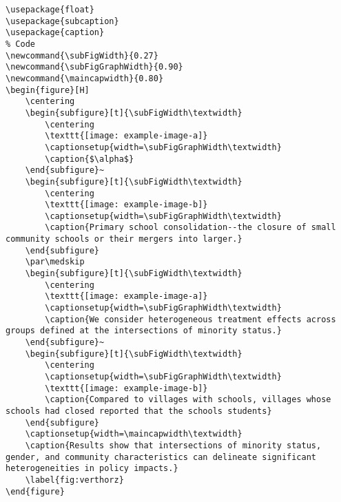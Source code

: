 \documentclass[12pt,english]{article}
\begin{document}
\begin{lstlisting}[frame=single]
% Included Package
\usepackage{float}
\usepackage{subcaption}
\usepackage{caption}
% Code
\newcommand{\subFigWidth}{0.27}
\newcommand{\subFigGraphWidth}{0.90}
\newcommand{\maincapwidth}{0.80}
\begin{figure}[H]
    \centering
    \begin{subfigure}[t]{\subFigWidth\textwidth}
        \centering
        \texttt{[image: example-image-a]}
        \captionsetup{width=\subFigGraphWidth\textwidth}
        \caption{$\alpha$}
    \end{subfigure}~
	\begin{subfigure}[t]{\subFigWidth\textwidth}
	    \centering
    	\texttt{[image: example-image-b]}
    	\captionsetup{width=\subFigGraphWidth\textwidth}
    	\caption{Primary school consolidation--the closure of small community schools or their mergers into larger.}
	\end{subfigure}
	\par\medskip
	\begin{subfigure}[t]{\subFigWidth\textwidth}
        \centering
        \texttt{[image: example-image-a]}
        \captionsetup{width=\subFigGraphWidth\textwidth}
        \caption{We consider heterogeneous treatment effects across groups defined at the intersections of minority status.}
    \end{subfigure}~
	\begin{subfigure}[t]{\subFigWidth\textwidth}
	    \centering
	    \captionsetup{width=\subFigGraphWidth\textwidth}
    	\texttt{[image: example-image-b]}
    	\caption{Compared to villages with schools, villages whose schools had closed reported that the schools students}
	\end{subfigure}
	\captionsetup{width=\maincapwidth\textwidth}
	\caption{Results show that intersections of minority status, gender, and community characteristics can delineate significant heterogeneities in policy impacts.}
	\label{fig:verthorz}
\end{figure}
\end{lstlisting}
\end{document}
